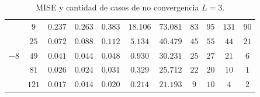 \begin{table}[hbt]
\begin{tabular}{cc|ccccc|cccc}
		\cmidrule(r){8-11}										
		\multirow{5 }{*}{$-8$}	
		&  $9  $ 	&  	 $0.237$ 	&	 $0.263$ 	&	 $0.383$ 	&	 $18.106$ 	&	 $73.081$ 	&	$83$	&	$95$		&\textbf{$131$} &	$90$ \\
		&  $25 $ 	&  	 $0.072$ 	&	 $0.088$ 	&	 $0.112$ 	&	 $5.134 $ 	&	 $40.479$ 	&	$45$	&\textbf{$55$}	&	$44$		&	$21$ \\
		&  $49 $ 	&  	 $0.041$ 	&	 $0.044$ 	&	 $0.048$ 	&	 $0.930 $ 	&	 $30.231$ 	&	$25$	&	$27$		&	$21$		&	$6$ \\
		&  $81 $ 	&  	 $0.026$ 	&	 $0.024$ 	&	 $0.031$ 	&	 $0.329 $ 	&	 $25.712$ 	&	$22$	&	$20$		&	$10$		&	$1$ \\
		&  $121$ 	&  	 $0.017$ 	&	 $0.014$ 	&	 $0.020$ 	&	 $0.214 $ 	&	 $21.193$ 	&	$9$ 	&	$10$		&	$4$			&	$2$ \\
	\end{tabular}										
\caption{\label{MiseyCantCasosNoConvergenciaL=3} MISE y cantidad de casos de no convergencia $L=3$.}									
\end{table}	

